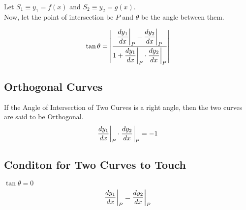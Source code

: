 \documentclass{article}
\begin{document}
Let $S_{1} \equiv y_{1}=f(x)$ and $S_{2} \equiv y_{2}=g(x)$. \\ Now, let the point of intersection be $P$ and $\theta$ be the angle between them.

$$\tan \theta = \abs{\dfrac{\displaystyle\dv{y_{1}}{x} \biggr\rvert_{P}-\displaystyle\dv{y_{2}}{x} \biggr\rvert_{P}}{1+\displaystyle\dv{y_{1}}{x} \biggr\rvert_{P} \cdot \displaystyle\dv{y_{2}}{x} \biggr\rvert_{P}}}$$

\subsection*{Orthogonal Curves}
If the Angle of Intersection of Two Curves is a right angle, then the two curves are said to be Orthogonal.
$$\displaystyle\dv{y_{1}}{x} \biggr\rvert_{P} \cdot \displaystyle\dv{y_{2}}{x} \biggr\rvert_{P}=-1$$

\subsection*{Conditon for Two Curves to Touch}
$\tan \theta = 0$
$$\displaystyle\dv{y_{1}}{x} \biggr\rvert_{P}=\displaystyle\dv{y_{2}}{x} \biggr\rvert_{P}$$
\end{document}
